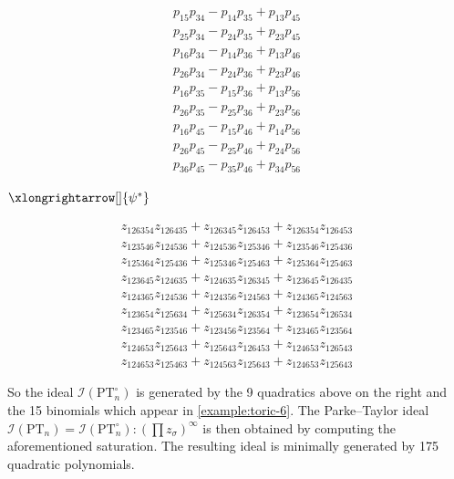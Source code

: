 \documentclass[12pt, reqno]{amsart}
\numberwithin{equation}{section}
\theoremstyle{plain}
\theoremstyle{definition}
\newenvironment{example}
  {\pushQED{\qed}\renewcommand{\qedsymbol}{$\triangle$}\examplex}
  {\popQED\endexamplex}
\newcommand{\ci}{\mathcal{I}}
\begin{document}
\begin{example}
\begin{minipage}{0.3\textwidth}
\begin{align*}
p_{15}p_{34}-p_{14}p_{35}+p_{13}p_{45} \\
p_{25}p_{34}-p_{24}p_{35}+p_{23}p_{45}\\
p_{16}p_{34}-p_{14}p_{36}+p_{13}p_{46}\\
p_{26}p_{34}-p_{24}p_{36}+p_{23}p_{46}\\
p_{16}p_{35}-p_{15}p_{36}+p_{13}p_{56}\\
p_{26}p_{35}-p_{25}p_{36}+p_{23}p_{56}\\
p_{16}p_{45}-p_{15}p_{46}+p_{14}p_{56}\\
p_{26}p_{45}-p_{25}p_{46}+p_{24}p_{56}\\
p_{36}p_{45}-p_{35}p_{46}+p_{34}p_{56}
\end{align*}
\end{minipage}
\begin{minipage}{0.1\textwidth}
\hspace*{6pt}
$\xlongrightarrow[]{\psi^\ast}$
\end{minipage}  
\begin{minipage}{0.4\textwidth}
\begin{align*}
 z_{126354}z_{126435}+z_{126345}z_{126453}+z_{126354}z_{126453}\\
z_{123546}z_{124536}+z_{124536}z_{125346}+z_{123546}z_{125436}\\
z_{125364}z_{125436}+z_{125346}z_{125463}+z_{125364}z_{125463}\\
z_{123645}z_{124635}+z_{124635}z_{126345}+z_{123645}z_{126435}\\
z_{124365}z_{124536}+z_{124356}z_{124563}+z_{124365}z_{124563}\\
z_{123654}z_{125634}+z_{125634}z_{126354}+z_{123654}z_{126534}\\
z_{123465}z_{123546}+z_{123456}z_{123564}+z_{123465}z_{123564}\\
z_{124653}z_{125643}+z_{125643}z_{126453}+z_{124653}z_{126543}\\
z_{124653}z_{125463}+z_{124563}z_{125643}+z_{124653}z_{125643}
\end{align*}
\end{minipage}  
\vspace*{0.5cm}

So the ideal $\ci(\mathrm{PT}_n^\circ)$ is generated by the 9 quadratics above on the right and the 15 binomials which appear in \cref{example:toric-6}. The Parke--Taylor ideal $\ci(\mathrm{PT}_n) = \ci(\mathrm{PT}_n^\circ):(\prod z_\sigma)^\infty$ is then obtained by computing the aforementioned saturation. The resulting ideal is minimally generated by 175 quadratic polynomials. 
\end{example}
\end{document}
